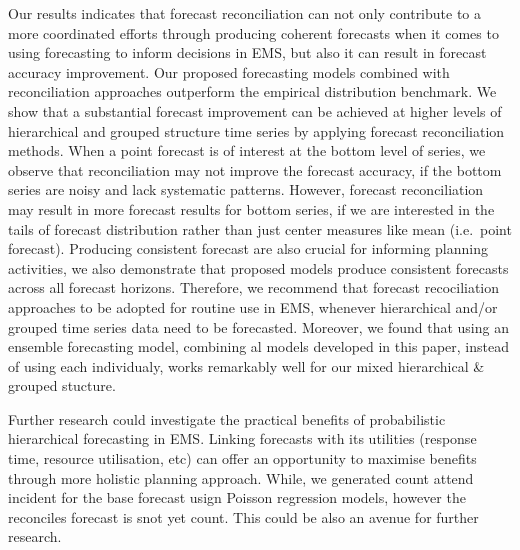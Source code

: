 \documentclass[
  authoryear,
  preprint,
  3p]{elsarticle}
\begin{document}
Our results indicates that forecast reconciliation can not only
contribute to a more coordinated efforts through producing coherent
forecasts when it comes to using forecasting to inform decisions in EMS,
but also it can result in forecast accuracy improvement. Our proposed
forecasting models combined with reconciliation approaches outperform
the empirical distribution benchmark. We show that a substantial
forecast improvement can be achieved at higher levels of hierarchical
and grouped structure time series by applying forecast reconciliation
methods. When a point forecast is of interest at the bottom level of
series, we observe that reconciliation may not improve the forecast
accuracy, if the bottom series are noisy and lack systematic patterns.
However, forecast reconciliation may result in more forecast results for
bottom series, if we are interested in the tails of forecast
distribution rather than just center measures like mean (i.e.~point
forecast). Producing consistent forecast are also crucial for informing
planning activities, we also demonstrate that proposed models produce
consistent forecasts across all forecast horizons. Therefore, we
recommend that forecast recociliation approaches to be adopted for
routine use in EMS, whenever hierarchical and/or grouped time series
data need to be forecasted. Moreover, we found that using an ensemble
forecasting model, combining al models developed in this paper, instead
of using each individualy, works remarkably well for our mixed
hierarchical \& grouped stucture.

Further research could investigate the practical benefits of
probabilistic hierarchical forecasting in EMS. Linking forecasts with
its utilities (response time, resource utilisation, etc) can offer an
opportunity to maximise benefits through more holistic planning
approach. While, we generated count attend incident for the base
forecast usign Poisson regression models, however the reconciles
forecast is snot yet count. This could be also an avenue for further
research.


\renewcommand\refname{References}
  
\end{document}
